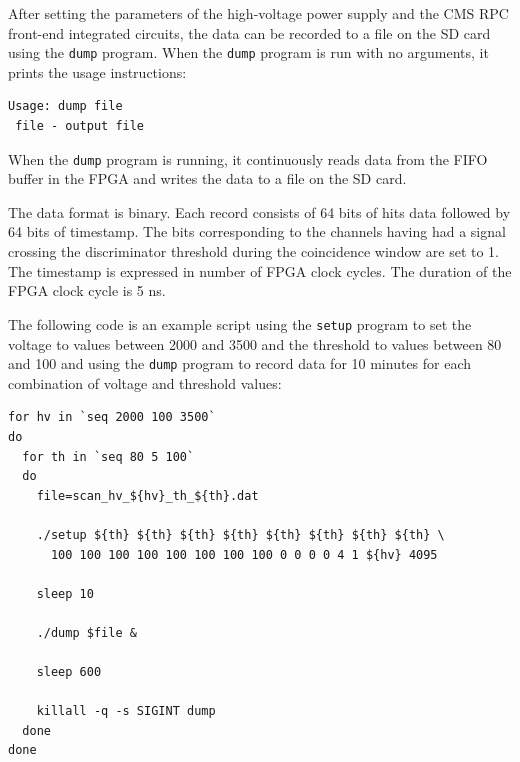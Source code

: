 \documentclass[12pt, a4paper]{article}
\begin{document}
After setting the parameters of the high-voltage power supply and the CMS RPC front-end integrated circuits, the data can be recorded to a file on the SD card using the \texttt{dump} program. When the \texttt{dump} program is run with no arguments, it prints the usage instructions:
\vspace{-1ex}
\begin{verbatim}
Usage: dump file
 file - output file
\end{verbatim}

When the \texttt{dump} program is running, it continuously reads data from the FIFO buffer in the FPGA and writes the data to a file on the SD card.

The data format is binary. Each record consists of 64 bits of hits data followed by 64 bits of timestamp. The bits corresponding to the channels having had a signal crossing the discriminator threshold during the coincidence window are set to 1. The timestamp is expressed in number of FPGA clock cycles. The duration of the FPGA clock cycle is 5 ns.

The following code is an example script using the \texttt{setup} program to set the voltage to values between 2000 and 3500 and the threshold to values between 80 and 100 and using the \texttt{dump} program to record data for 10 minutes for each combination of voltage and threshold values:
\vspace{-1ex}
\begin{verbatim}
for hv in `seq 2000 100 3500`
do
  for th in `seq 80 5 100`
  do
    file=scan_hv_${hv}_th_${th}.dat

    ./setup ${th} ${th} ${th} ${th} ${th} ${th} ${th} ${th} \
      100 100 100 100 100 100 100 100 0 0 0 0 4 1 ${hv} 4095

    sleep 10

    ./dump $file &

    sleep 600

    killall -q -s SIGINT dump
  done
done
\end{verbatim}

\newpage

\printbibliography
\end{document}
